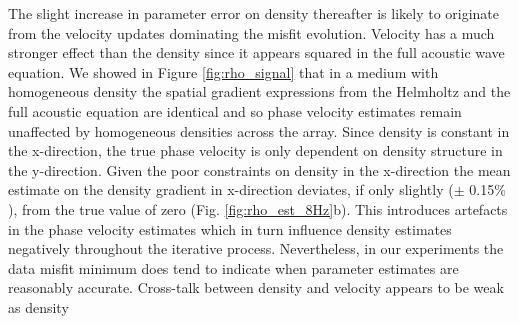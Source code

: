 \documentclass{article}
\begin{document}
	The slight increase in parameter error on density thereafter is likely to originate from the velocity updates dominating the misfit evolution. Velocity has a much stronger effect than the density since it appears squared in the full acoustic wave equation. We showed in Figure \ref{fig:rho_signal} that in a medium with homogeneous density the spatial gradient expressions from the Helmholtz and the full acoustic equation are identical and so phase velocity estimates remain unaffected by homogeneous densities across the array. Since density is constant in the x-direction, the true phase velocity is only dependent on density structure in the y-direction. Given the poor constraints on density in the x-direction the mean estimate on the density gradient in x-direction deviates, if only slightly ($\pm$ 0.15$\%$), from the true value of zero (Fig. \ref{fig:rho_est_8Hz}b). This introduces artefacts in the phase velocity estimates which in turn influence density estimates negatively throughout the iterative process. Nevertheless, in our experiments the data misfit minimum does tend to indicate when parameter estimates are reasonably accurate. Cross-talk between density and velocity appears to be weak as density
\end{document}
